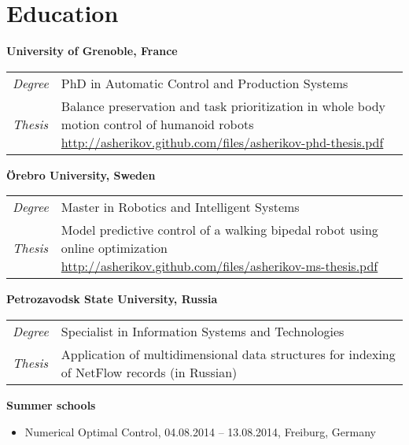 \documentclass[a4paper,10pt]{report}
\begin{document}
\section{Education}
\begin{adjustwidth}{0.5cm}{0pt}
    {\bf {} University of Grenoble, France}\\
    \begin{tabularx}{\linewidth}{l X}
        {\it Degree}    & PhD in Automatic Control and Production Systems\\
        {\it Thesis}    &   Balance preservation and task prioritization in whole
                            body motion control of humanoid robots
                            \href{http://asherikov.github.com/files/asherikov-phd-thesis.pdf}
                            {http://asherikov.github.com/files/asherikov-phd-thesis.pdf}\\
    \end{tabularx}

    \vspace{0.2cm}

    {\bf {} \"Orebro University, Sweden}\\
    \begin{tabularx}{\linewidth}{l X}
        {\it Degree}    & Master in Robotics and Intelligent Systems\\
        {\it Thesis}    &   Model predictive control of a walking bipedal robot
                            using online optimization
                            \href{http://asherikov.github.com/files/asherikov-ms-thesis.pdf}
                            {http://asherikov.github.com/files/asherikov-ms-thesis.pdf}\\
    \end{tabularx}

    \vspace{0.2cm}

    {\bf {} Petrozavodsk State University, Russia}\\
    \begin{tabularx}{\linewidth}{l X}
        {\it Degree}    & Specialist in Information Systems and Technologies\\
        {\it Thesis}    &   Application of multidimensional data structures
                            for indexing of NetFlow records (in Russian)\\
    \end{tabularx}

    \vspace{0.2cm}


\pagebreak
    {\bf Summer schools}
    \begin{itemize}
        \item Numerical Optimal Control, 04.08.2014 -- 13.08.2014, Freiburg, Germany
    \end{itemize}
\end{adjustwidth}
\end{document}
